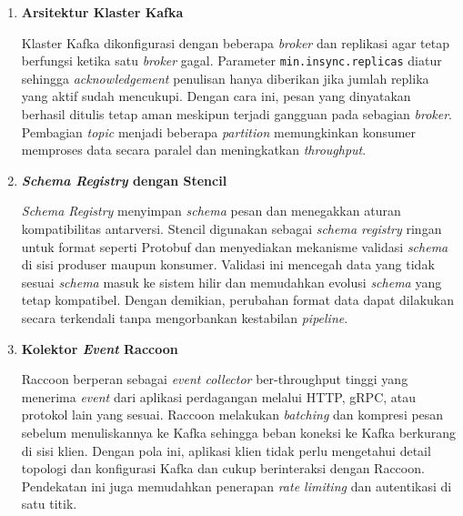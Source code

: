 \vspace{0.5em}
\begin{enumerate}
    \item \textbf{Arsitektur Klaster Kafka}  

    Klaster Kafka dikonfigurasi dengan beberapa \textit{broker} dan replikasi agar tetap berfungsi ketika satu \textit{broker} gagal. Parameter \texttt{min.insync.replicas} diatur sehingga \textit{acknowledgement} penulisan hanya diberikan jika jumlah replika yang aktif sudah mencukupi. Dengan cara ini, pesan yang dinyatakan berhasil ditulis tetap aman meskipun terjadi gangguan pada sebagian \textit{broker}. Pembagian \textit{topic} menjadi beberapa \textit{partition} memungkinkan konsumer memproses data secara paralel dan meningkatkan \textit{throughput}.

    \vspace{0.5em}

    \item \textbf{\textit{Schema Registry} dengan Stencil}  

    \textit{Schema Registry} menyimpan \textit{schema} pesan dan menegakkan aturan kompatibilitas antarversi. Stencil digunakan sebagai \textit{schema registry} ringan untuk format seperti Protobuf dan menyediakan mekanisme validasi \textit{schema} di sisi produser maupun konsumer. Validasi ini mencegah data yang tidak sesuai \textit{schema} masuk ke sistem hilir dan memudahkan evolusi \textit{schema} yang tetap kompatibel. Dengan demikian, perubahan format data dapat dilakukan secara terkendali tanpa mengorbankan kestabilan \textit{pipeline}.

    \vspace{0.5em}

    \item \textbf{Kolektor \textit{Event} Raccoon}  

    Raccoon berperan sebagai \textit{event collector} ber-throughput tinggi yang menerima \textit{event} dari aplikasi perdagangan melalui HTTP, gRPC, atau protokol lain yang sesuai. Raccoon melakukan \textit{batching} dan kompresi pesan sebelum menuliskannya ke Kafka sehingga beban koneksi ke Kafka berkurang di sisi klien. Dengan pola ini, aplikasi klien tidak perlu mengetahui detail topologi dan konfigurasi Kafka dan cukup berinteraksi dengan Raccoon. Pendekatan ini juga memudahkan penerapan \textit{rate limiting} dan autentikasi di satu titik.

    \vspace{0.5em}


\end{enumerate}
